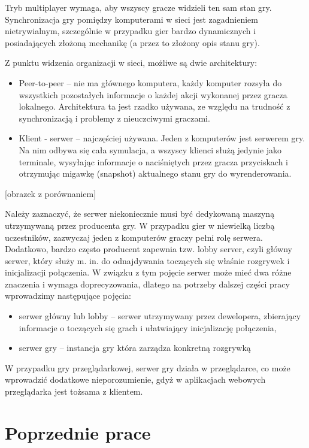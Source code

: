 Tryb multiplayer wymaga, aby wszyscy gracze widzieli ten sam stan gry.
Synchronizacja gry pomiędzy komputerami w sieci jest zagadnieniem nietrywialnym,
szczególnie w przypadku gier bardzo dynamicznych i posiadających złożoną mechanikę
(a przez to złożony opis stanu gry).

Z punktu widzenia organizacji w sieci, możliwe są dwie architektury:
\begin{itemize}
\item Peer-to-peer -- nie ma głównego komputera, każdy komputer rozsyła do wszystkich
  pozostałych informacje o każdej akcji wykonanej przez gracza lokalnego. Architektura
  ta jest rzadko używana, ze względu na trudność z synchronizacją i problemy z
  nieuczciwymi graczami.
\item Klient - serwer -- najczęściej używana. Jeden z komputerów jest serwerem
  gry. Na nim odbywa się cała symulacja, a wszyscy klienci służą jedynie jako
  terminale, wysyłając informacje o naciśniętych przez gracza przyciskach
  i otrzymując migawkę (snapshot) aktualnego stanu gry do wyrenderowania.
\end {itemize}

[obrazek z porównaniem]

Należy zaznaczyć, że serwer niekoniecznie musi być dedykowaną maszyną utrzymywaną
przez producenta gry. W przypadku gier w niewielką liczbą uczestników,
zazwyczaj jeden z komputerów graczy pełni rolę serwera. Dodatkowo, bardzo
często producent zapewnia tzw. lobby server, czyli główny serwer,
który służy m. in. do odnajdywania toczących się właśnie rozgrywek
i inicjalizacji połączenia. W związku z tym pojęcie serwer może mieć
dwa różne znaczenia i wymaga doprecyzowania, dlatego na potrzeby dalszej części pracy
wprowadzimy następujące pojęcia:
\begin{itemize}
\item serwer główny lub lobby -- serwer utrzymywany przez dewelopera, zbierający
  informacje o toczących się grach i ułatwiający inicjalizację połączenia,
\item serwer gry -- instancja gry która zarządza konkretną rozgrywką
\end{itemize}
W przypadku gry przeglądarkowej, serwer gry działa w przeglądarce, co może
wprowadzić dodatkowe nieporozumienie, gdyż w aplikacjach webowych przeglądarka
jest tożsama z klientem.


\section{Poprzednie prace}
\label{sec:poprzedniePrace}

